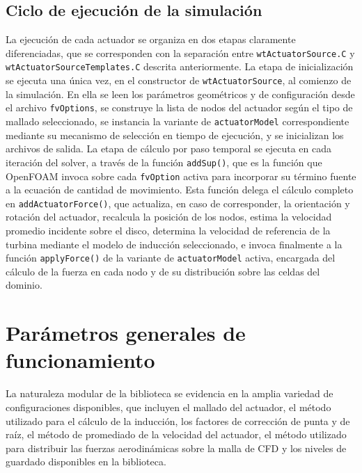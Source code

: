 \subsection{Ciclo de ejecución de la simulación \checkmark}
La ejecución de cada actuador se organiza en dos etapas claramente diferenciadas, que se corresponden con la separación entre \texttt{wtActuatorSource.C} y \texttt{wtActuatorSourceTemplates.C} descrita anteriormente.
La etapa de inicialización se ejecuta una única vez, en el constructor de \texttt{wtActuatorSource}, al comienzo de la simulación. En ella se leen los parámetros geométricos y de configuración desde el archivo \texttt{fvOptions}, se construye la lista de nodos del actuador según el tipo de mallado seleccionado, se instancia la variante de \texttt{actuatorModel} correspondiente mediante su mecanismo de selección en tiempo de ejecución, y se inicializan los archivos de salida.
La etapa de cálculo por paso temporal se ejecuta en cada iteración del solver, a través de la función \texttt{addSup()}, que es la función que OpenFOAM invoca sobre cada \texttt{fvOption} activa para incorporar su término fuente a la ecuación de cantidad de movimiento. Esta función delega el cálculo completo en \texttt{addActuatorForce()}, que actualiza, en caso de corresponder, la orientación y rotación del actuador, recalcula la posición de los nodos, estima la velocidad promedio incidente sobre el disco, determina la velocidad de referencia de la turbina mediante el modelo de inducción seleccionado, e invoca finalmente a la función \texttt{applyForce()} de la variante de \texttt{actuatorModel} activa, encargada del cálculo de la fuerza en cada nodo y de su distribución sobre las celdas del dominio.

\section{Parámetros generales de funcionamiento}
\label{sec:parametrosGenerales}

La naturaleza modular de la biblioteca se evidencia en la amplia variedad de configuraciones disponibles, que incluyen el mallado del actuador, el método utilizado para el cálculo de la inducción, los factores de corrección de punta y de raíz, el método de promediado de la velocidad del actuador, el método utilizado para distribuir las fuerzas aerodinámicas sobre la malla de CFD y los niveles de guardado disponibles en la biblioteca.

